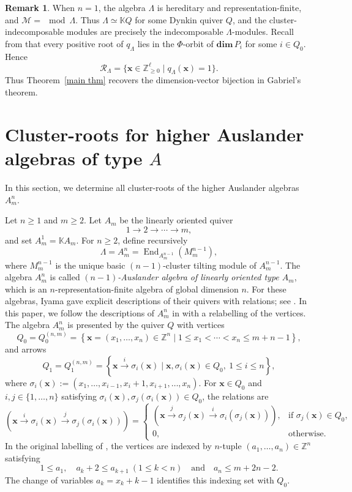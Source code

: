 \documentclass[11pt,a4paper]{amsart}
\theoremstyle{definition}
\newtheorem{remark}[theorem]{Remark}
\numberwithin{equation}{section}
\newcommand{\Z}{\mathbb{Z}}
\newcommand{\x}{\mathbf{x}}
\newcommand{\0}{\mathbf{0}}
\newcommand{\dimv}{\mathbf{dim}\,}
\begin{document}
		
		
		\begin{remark}
			When $n=1$, the algebra $\Lambda$ is hereditary and
			representation-finite, and $\mathcal M=\mod\Lambda$.
			Thus $\Lambda\simeq\mathbb KQ$ for some Dynkin quiver $Q$,
			and the cluster-indecomposable modules are precisely
			the indecomposable $\Lambda$-modules. Recall from \cite[VII, Proposition 4.14]{ASS} that			
			every positive root of $q_\Lambda$ lies in the
			$\Phi$-orbit of $\dimv P_i$ for some $i\in Q_0$.
			Hence
			\[
			\mathcal R_\Lambda
			=
			\{\x\in\Z_{\geq0}^{\ell}\mid q_\Lambda(\x)=1\}.
			\]
			Thus Theorem~\ref{main thm} recovers the
			dimension-vector bijection in Gabriel's theorem.
		\end{remark}
		
	\section{Cluster-roots for higher Auslander algebras of type $A$}
		In this section, we  determine all cluster-roots of the higher
		Auslander algebras $A_m^n$.
			
		
	Let $n\geq1$ and $m\ge 2$.  Let $A_m$ be the linearly oriented
	quiver
	\[
	1\longrightarrow 2\longrightarrow\cdots\longrightarrow m,
	\]
	and set $A_m^1=\mathbb K A_m$.  For $n\geq2$, define recursively
	\[
	\Lambda=A_m^n
	=
	\operatorname{End}_{A_m^{n-1}}(M_m^{n-1}),
	\]
	where $M_m^{n-1}$ is the unique basic
	$(n-1)$-cluster tilting module of $A_m^{n-1}$.
	The algebra $A_m^n$ is called \emph{$(n-1)$-Auslander algebra of linearly oriented type $A_m$}, which  is an $n$-representation-finite algebra of global dimension $n$. For these algebras, Iyama gave explicit descriptions of their quivers with relations; see \cite{I2}.  In this paper, we follow the descriptions of $A_m^n$ in
	\cite[Theorem/Construction~3.4]{OT} with a relabelling of the
	vertices.  The algebra $A_m^n$ is presented by the quiver $Q$ with vertices
	\[
	Q_0=Q_0^{(n,m)}=
	\left\{
	\x=(x_1,\ldots,x_n)\in\mathbb Z^n
	 \mid
	1\le x_1<\cdots< x_n\le  m+n-1
	\right\},
	\]
	and arrows
	\[
	Q_1=Q_1^{(n,m)}=
	\left\{
	\x\xrightarrow{i}\sigma_i(\x)
	 \mid
	\x,\sigma_i(\x)\in Q_0,\ 1\le i\le n
	\right\},
	\]
	where $\sigma_i(\x):=(x_1,\dots,x_{i-1},x_i+1,x_{i+1},\dots,x_n)$. For
	$\x\in Q_0$ and $i,j\in\{1,\ldots,n\}$ satisfying
	$\sigma_i(\x),\sigma_j(\sigma_i(\x))\in Q_0$, the  relations are 
	\[
	(
	\x\xrightarrow{i}\sigma_i(\x)
	\xrightarrow{j}\sigma_j(\sigma_i(\x))
	)
	=
	\begin{cases}
		(
		\x\xrightarrow{j}\sigma_j(\x)
		\xrightarrow{i}\sigma_i(\sigma_j(\x))
		),
		&\text{if }\sigma_j(\x)\in Q_0,\\[2mm]
		0,&\text{otherwise}.
	\end{cases}
	\]	
	In the original labelling of \cite{OT}, the vertices are indexed by
	$n$-tuple $(a_1,\ldots,a_n)\in\mathbb Z^n$ satisfying
	\[
	1\leq a_1,\quad
	a_k+2\leq a_{k+1}\ (1\leq k<n)\quad \text{and} \quad
	a_n\leq m+2n-2.
	\] The change of variables $a_k=x_k+k-1$ identifies
	this indexing set with $Q_0$. 
	
\end{document}
